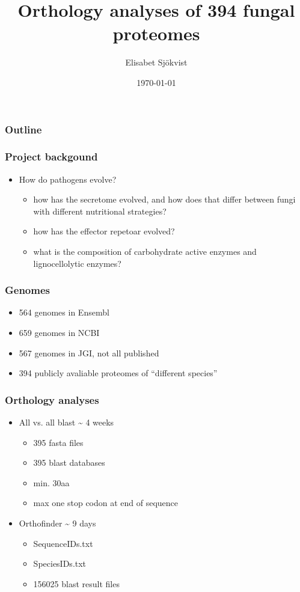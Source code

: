 \documentclass{beamer}
\title{Orthology analyses of 394 fungal proteomes}
\author{Elisabet Sjökvist}
\date{\today}
\begin{document}
\maketitle

\begin{frame}
\frametitle{Outline}
\setcounter{tocdepth}{3}
\tableofcontents
\end{frame}


\begin{frame}
\frametitle{Project backgound}
\label{sec-1}

\begin{itemize}
\item How do pathogens evolve?
\begin{itemize}
\item how has the secretome evolved, and how does that differ between fungi with different nutritional strategies?
\item how has the effector repetoar evolved?
\item what is the composition of carbohydrate active enzymes and lignocellolytic enzymes?
\end{itemize}
\end{itemize}
  
\end{frame}
\begin{frame}
\frametitle{Genomes}
\label{sec-2}

\begin{itemize}
\item 564 genomes in Ensembl
\item 659 genomes in NCBI
\item 567 genomes in JGI, not all published
\item 394 publicly avaliable proteomes of ``different species''
\end{itemize}
\end{frame}
\begin{frame}
\frametitle{Orthology analyses}
\label{sec-3}
\begin{itemize}

\item All vs. all blast \~{} 4 weeks
\label{sec-3-1}%
\begin{itemize}
\item 395 fasta files
\item 395 blast databases
\item min. 30aa
\item max one stop codon at end of sequence
\end{itemize}

\item Orthofinder \~{} 9 days
\label{sec-3-2}%
\begin{itemize}
\item SequenceIDs.txt
\item SpeciesIDs.txt
\item 156025 blast result files
\end{itemize}
\end{itemize} %
\end{frame}
\end{document}

